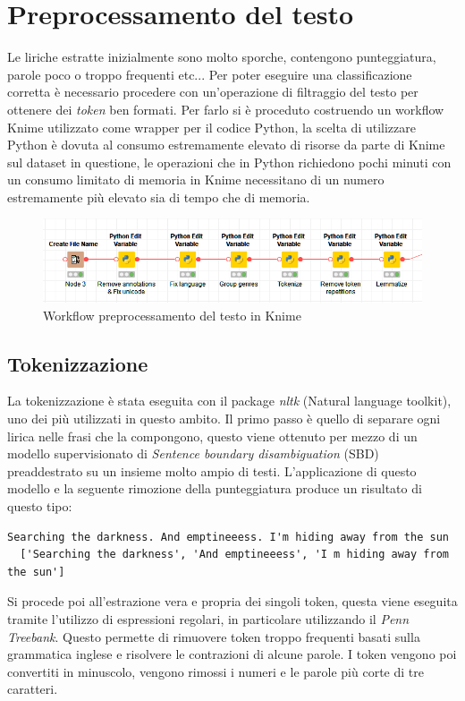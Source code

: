 \documentclass[technote]{IEEEtran}
\begin{document}
\section{Preprocessamento del testo}
Le liriche estratte inizialmente sono molto sporche, contengono punteggiatura, parole poco o troppo frequenti etc... Per poter eseguire una classificazione corretta è necessario procedere con un'operazione di filtraggio del testo per ottenere dei \textit{token} ben formati. Per farlo si è proceduto costruendo un workflow Knime utilizzato come wrapper per il codice Python, la scelta di utilizzare Python è dovuta al consumo estremamente elevato di risorse da parte di Knime sul dataset in questione, le operazioni che in Python richiedono pochi minuti con un consumo limitato di memoria in Knime necessitano di un numero estremamente più elevato sia di tempo che di memoria.
\begin{figure}[H]
\centerline{\includegraphics[width=1\columnwidth]{images/knime-text-prep}}
\caption{Workflow preprocessamento del testo in Knime}
\label{fig_knime_prep}
\end{figure}
\subsection{Tokenizzazione}
La tokenizzazione è stata eseguita con il package \textit{nltk} (Natural language toolkit), uno dei più utilizzati in questo ambito. Il primo passo è quello di separare ogni lirica nelle frasi che la compongono, questo viene ottenuto per mezzo di un modello supervisionato di \textit{Sentence boundary disambiguation} (SBD) preaddestrato su un insieme molto ampio di testi. L'applicazione di questo modello e la seguente rimozione della punteggiatura produce un risultato di questo tipo:

\begin{lstlisting}[basicstyle=\tiny]
  Searching the darkness. And emptineeess. I'm hiding away from the sun  
  ['Searching the darkness', 'And emptineeess', 'I m hiding away from the sun']  
\end{lstlisting}
Si procede poi all'estrazione vera e propria dei singoli token, questa viene eseguita tramite l'utilizzo di espressioni regolari, in particolare utilizzando il \textit{Penn Treebank}. Questo permette di rimuovere token troppo frequenti basati sulla grammatica inglese e risolvere le contrazioni di alcune parole. I token vengono poi convertiti in minuscolo, vengono rimossi i numeri e le parole più corte di tre caratteri.
\end{document}
